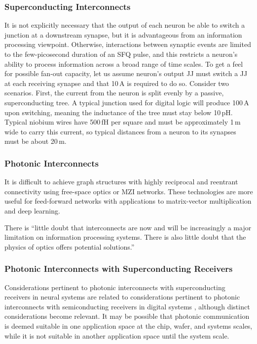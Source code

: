 \subsubsection{\label{sec:superconducting_interconnects}Superconducting Interconnects}
It is not explicitly necessary that the output of each neuron be able to switch a junction at a downstream synapse, but it is advantageous from an information processing viewpoint. Otherwise, interactions between synaptic events are limited to the few-picosecond duration of an SFQ pulse, and this restricts a neuron's ability to process information across a broad range of time scales. To get a feel for possible fan-out capacity, let us assume neuron's output JJ must switch a JJ at each receiving synapse and that 10\,\textmu A is required to do so. Consider two scenarios. First, the current from the neuron is split evenly by a passive, superconducting tree. A typical junction used for digital logic will produce 100\,\textmu A upon switching, meaning the inductance of the tree must stay below 10\,pH. Typical niobium wires have 500\,fH per square and must be approximately 1\,\textmu m wide to carry this current, so typical distances from a neuron to its synapses must be about 20\,\textmu m.

\subsubsection{Photonic Interconnects}
It is difficult to achieve graph structures with highly reciprocal and reentrant connectivity using free-space optics or MZI networks. These technologies are more useful for feed-forward networks with applications to matrix-vector multiplication and deep learning.
 

\vspace{3em}
There is ``little doubt that interconnects are now and will be increasingly a major limitation on information processing systems. There is also little doubt that the physics of optics offers potential solutions.'' \cite{mi2009}

\vspace{3em}


\subsubsection{Photonic Interconnects with Superconducting Receivers}
Considerations pertinent to photonic interconnects with superconducting receivers in neural systems are related to considerations pertinent to photonic interconnects with semiconducting receivers in digital systems \cite{mi2009,mi2017}, although distinct considerations become relevant. It may be possible that photonic communication is deemed suitable in one application space at the chip, wafer, and systems scales, while it is not suitable in another application space until the system scale. 


